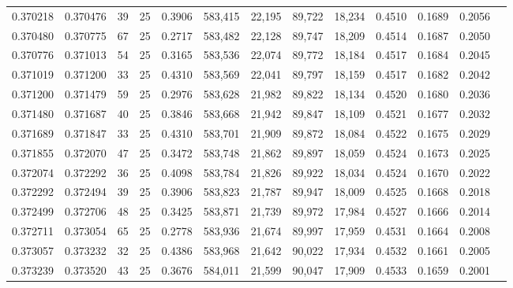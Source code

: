 \begin{tabular}{rrrrrrrrrrrrr}
0.370218 & 0.370476 &    39 &  25 &                                     0.3906 & 583,415 &  22,195 &  89,722 &  18,234 & 0.4510 & 0.1689 & 0.2056 \\
0.370480 & 0.370775 &    67 &  25 &                                     0.2717 & 583,482 &  22,128 &  89,747 &  18,209 & 0.4514 & 0.1687 & 0.2050 \\
0.370776 & 0.371013 &    54 &  25 &                                     0.3165 & 583,536 &  22,074 &  89,772 &  18,184 & 0.4517 & 0.1684 & 0.2045 \\
0.371019 & 0.371200 &    33 &  25 &                                     0.4310 & 583,569 &  22,041 &  89,797 &  18,159 & 0.4517 & 0.1682 & 0.2042 \\
0.371200 & 0.371479 &    59 &  25 &                                     0.2976 & 583,628 &  21,982 &  89,822 &  18,134 & 0.4520 & 0.1680 & 0.2036 \\
0.371480 & 0.371687 &    40 &  25 &                                     0.3846 & 583,668 &  21,942 &  89,847 &  18,109 & 0.4521 & 0.1677 & 0.2032 \\
0.371689 & 0.371847 &    33 &  25 &                                     0.4310 & 583,701 &  21,909 &  89,872 &  18,084 & 0.4522 & 0.1675 & 0.2029 \\
0.371855 & 0.372070 &    47 &  25 &                                     0.3472 & 583,748 &  21,862 &  89,897 &  18,059 & 0.4524 & 0.1673 & 0.2025 \\
0.372074 & 0.372292 &    36 &  25 &                                     0.4098 & 583,784 &  21,826 &  89,922 &  18,034 & 0.4524 & 0.1670 & 0.2022 \\
0.372292 & 0.372494 &    39 &  25 &                                     0.3906 & 583,823 &  21,787 &  89,947 &  18,009 & 0.4525 & 0.1668 & 0.2018 \\
0.372499 & 0.372706 &    48 &  25 &                                     0.3425 & 583,871 &  21,739 &  89,972 &  17,984 & 0.4527 & 0.1666 & 0.2014 \\
0.372711 & 0.373054 &    65 &  25 &                                     0.2778 & 583,936 &  21,674 &  89,997 &  17,959 & 0.4531 & 0.1664 & 0.2008 \\
0.373057 & 0.373232 &    32 &  25 &                                     0.4386 & 583,968 &  21,642 &  90,022 &  17,934 & 0.4532 & 0.1661 & 0.2005 \\
0.373239 & 0.373520 &    43 &  25 &                                     0.3676 & 584,011 &  21,599 &  90,047 &  17,909 & 0.4533 & 0.1659 & 0.2001 \\

\end{tabular}
